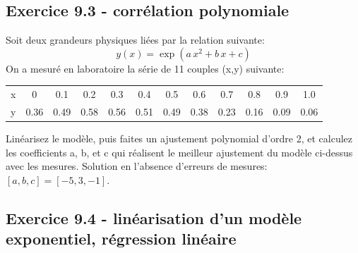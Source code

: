 \subsection*{Exercice 9.3 - corrélation polynomiale}

Soit deux grandeurs physiques liées par la relation suivante:
$$
    y(x)=\exp{(a\,x^2+b\,x+c)}
$$
On a mesuré en laboratoire la série de 11 couples (x,y) suivante:
\begin{center}
    \begin{tabular}{r|ccccccccccc}
        x & 0    & 0.1  & 0.2  & 0.3  & 0.4  & 0.5  & 0.6  & 0.7  & 0.8  & 0.9  & 1.0  \\
        y & 0.36 & 0.49 & 0.58 & 0.56 & 0.51 & 0.49 & 0.38 & 0.23 & 0.16 & 0.09 & 0.06
    \end{tabular}
\end{center}
Linéarisez le modèle, puis faites un ajustement polynomial d'ordre 2, et calculez les coefficients a, b, et c qui réalisent le meilleur ajustement du modèle ci-dessus avec les mesures. Solution en l'absence d'erreurs de mesures: $[a,b,c]=[-5,3,-1]$.

\subsection*{Exercice 9.4 - linéarisation d'un modèle exponentiel, régression linéaire}

